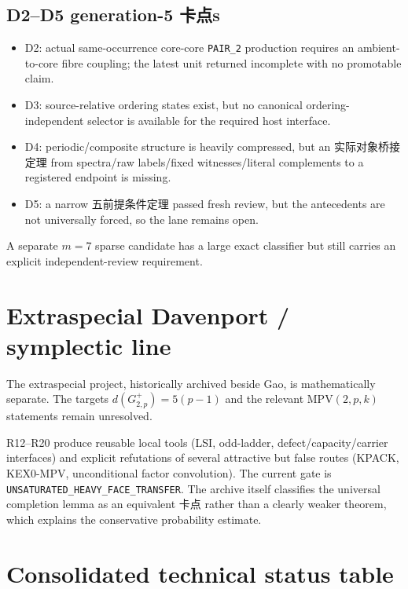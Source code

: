 \documentclass[11pt,a4paper]{ctexart}
\begin{document}
\subsection{D2--D5 generation-5 卡点s}

\begin{itemize}
\item D2: actual same-occurrence core-core \texttt{PAIR\_2} production requires an ambient-to-core fibre coupling; the latest unit returned incomplete with no promotable claim.
\item D3: source-relative ordering states exist, but no canonical ordering-independent selector is available for the required host interface.
\item D4: periodic/composite structure is heavily compressed, but an 实际对象桥接定理 from spectra/raw labels/fixed witnesses/literal complements to a registered endpoint is missing.
\item D5: a narrow 五前提条件定理 passed fresh review, but the antecedents are not universally forced, so the lane remains open.
\end{itemize}

A separate $m=7$ sparse candidate has a large exact classifier but still carries an explicit independent-review requirement.

\section{Extraspecial Davenport / symplectic line}

The extraspecial project, historically archived beside Gao, is mathematically separate. The targets $d(G^+_{2,p})=5(p-1)$ and the relevant $\mathrm{MPV}(2,p,k)$ statements remain unresolved.

R12--R20 produce reusable local tools (LSI, odd-ladder, defect/capacity/carrier interfaces) and explicit refutations of several attractive but false routes (KPACK, KEX0-MPV, unconditional factor convolution). The current gate is \texttt{UNSATURATED\_HEAVY\_FACE\_TRANSFER}. The archive itself classifies the universal completion lemma as an equivalent 卡点 rather than a clearly weaker theorem, which explains the conservative probability estimate.

\section{Consolidated technical status table}
\end{document}

